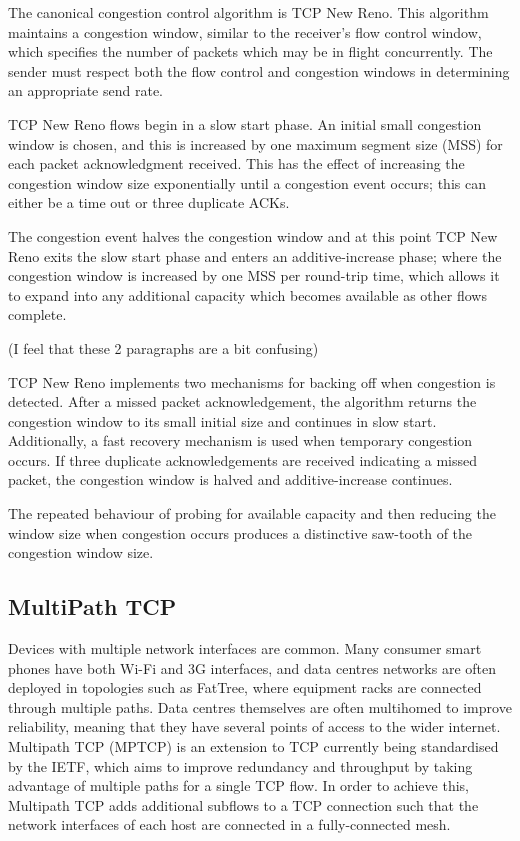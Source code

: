 The canonical congestion control algorithm is TCP New Reno. This algorithm
maintains a congestion window, similar to the receiver's flow control window,
which specifies the number of packets which may be in flight concurrently. The
sender must respect both the flow control and congestion windows in determining
an appropriate send rate.

TCP New Reno flows begin in a slow start phase. An initial small congestion
window is chosen, and this is increased by one maximum segment size (MSS) for
each packet acknowledgment received. This has the effect of increasing the
congestion window size exponentially until a congestion event occurs; this can 
either be a time out or three duplicate ACKs. 

The congestion event halves the congestion window and at this point TCP New Reno 
exits the slow start phase and enters an additive-increase phase; where the 
congestion window is increased by one MSS per round-trip time, which allows it 
to expand into any additional capacity which becomes available as other flows 
complete.

(I feel that these 2 paragraphs are a bit confusing)

TCP New Reno implements two mechanisms for backing off when congestion is
detected. After a missed packet acknowledgement, the algorithm returns the
congestion window to its small initial size and continues in slow start.
Additionally, a fast recovery mechanism is used when temporary congestion
occurs. If three duplicate acknowledgements are received indicating a missed
packet, the congestion window is halved and additive-increase continues.

The repeated behaviour of probing for available capacity and then reducing the
window size when congestion occurs produces a distinctive saw-tooth of the
congestion window size.

\subsection{MultiPath TCP}
Devices with multiple network interfaces are common. Many consumer smart phones
have both Wi-Fi and 3G interfaces, and data centres networks are often deployed
in topologies such as FatTree, where equipment racks are connected through
multiple paths. Data centres themselves are often multihomed to improve
reliability, meaning that they have several points of access to the wider
internet. Multipath TCP (MPTCP) is an extension to TCP currently being
standardised by the IETF, which aims to improve redundancy and throughput by
taking advantage of multiple paths for a single TCP flow. In order to achieve
this, Multipath TCP adds additional subflows to a TCP connection such that the 
network interfaces of each host are connected in a fully-connected mesh.

